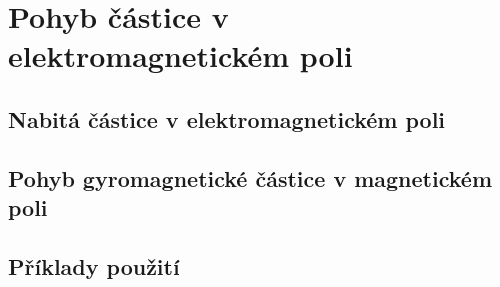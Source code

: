 \graphicspath{{../src/FYZ/img/}}
\setchaptertoc
\chapter{Pohyb částice v elektromagnetickém poli}\label{fyz:IIIchapVI}
  \section{Nabitá částice v elektromagnetickém poli}\label{fyz:IIIchapVIsecI}
  \section{Pohyb gyromagnetické částice v magnetickém poli}\label{fyz:IIIchapVIsecII}
  \section{Příklady použití}\label{fyz:IIIchapVIsecIII}

